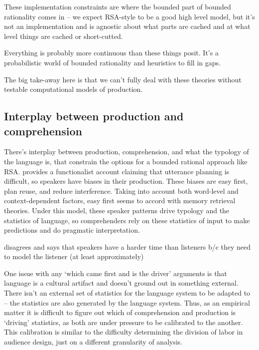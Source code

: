 \documentclass[]{article}
\begin{document}
These implementation constraints are where the bounded part of bounded rationality comes in -- we expect RSA-style to be a good high level model, but it's not an implementation and is agnostic about what parts are cached and at what level things are cached or short-cutted. 

Everything is probably more continuous than these things posit. It's a probabilistic world of bounded rationality and heuristics to fill in gaps. 

The big take-away here is that we can't fully deal with these theories without testable computational models of production. %

\subsection{Interplay between production and comprehension}

There's interplay between production, comprehension, and what the typology of the language is, that constrain the options for a bounded rational approach like RSA. \cite{macdonald2013} provides a functionalist account claiming that utterance planning is difficult, so speakers have biases in their production. These biases are easy first, plan reuse, and reduce interference. Taking into account both word-level and context-dependent factors, easy first seems to accord with memory retrieval theories. %
Under this model, these speaker patterns drive typology and the statistics of language, so comprehenders rely on these statistics of input to make predictions and do pragmatic interpretation. 

\cite{heller2012} disagrees and says that speakers have a harder time than listeners b/c they need to model the listener (at least approximately) %

One issue with any `which came first and is the driver' arguments is that language is a cultural artifact and doesn't ground out in something external. There isn't an external set of statistics for the language system to be adapted to -- the statistics are also generated by the language system. Thus, as an empirical matter it is difficult to figure out which of comprehension and production is `driving' statistics, as both are under pressure to be calibrated to the another. This calibration is similar to the difficulty determining the division of labor in audience design, just on a different granularity of analysis. 
\end{document}
